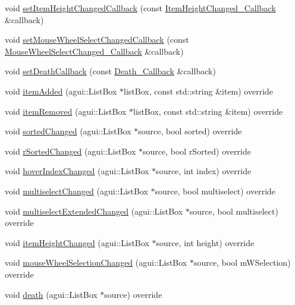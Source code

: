 \begin{DoxyCompactItemize}
\item 
void \mbox{\hyperlink{classec_1_1_generic_list_box_listener_a41a4c91d77d0b3470147489b09c7d140}{set\+Item\+Height\+Changed\+Callback}} (const \mbox{\hyperlink{classec_1_1_generic_list_box_listener_aaba7b764c07b0c7cffd9b880bdf46358}{Item\+Height\+Changed\+\_\+\+Callback}} \&callback)
\item 
void \mbox{\hyperlink{classec_1_1_generic_list_box_listener_af51feb582139508e18215d7ae8430886}{set\+Mouse\+Wheel\+Select\+Changed\+Callback}} (const \mbox{\hyperlink{classec_1_1_generic_list_box_listener_abe17afe409710ad4f15673669a8ebbb3}{Mouse\+Wheel\+Select\+Changed\+\_\+\+Callback}} \&callback)
\item 
void \mbox{\hyperlink{classec_1_1_generic_list_box_listener_add7031a36395dc935dbc0adff256c4e1}{set\+Death\+Callback}} (const \mbox{\hyperlink{classec_1_1_generic_list_box_listener_a121e777735fcbf9e15e147d820e5718e}{Death\+\_\+\+Callback}} \&callback)
\item 
void \mbox{\hyperlink{classec_1_1_generic_list_box_listener_a6003842e8b318a5b28a456158bd5eab1}{item\+Added}} (agui\+::\+List\+Box $\ast$list\+Box, const std\+::string \&item) override
\item 
void \mbox{\hyperlink{classec_1_1_generic_list_box_listener_a9b2412b88135015e4aaa57ad6f8f1a79}{item\+Removed}} (agui\+::\+List\+Box $\ast$list\+Box, const std\+::string \&item) override
\item 
void \mbox{\hyperlink{classec_1_1_generic_list_box_listener_a52b32a361ac45c09f0a3ada6e52334d6}{sorted\+Changed}} (agui\+::\+List\+Box $\ast$source, bool sorted) override
\item 
void \mbox{\hyperlink{classec_1_1_generic_list_box_listener_a50f60a671cd8dcfcce7ab99d7383ad4f}{r\+Sorted\+Changed}} (agui\+::\+List\+Box $\ast$source, bool r\+Sorted) override
\item 
void \mbox{\hyperlink{classec_1_1_generic_list_box_listener_a222a9b88623d11a0a60a6caec4f59259}{hover\+Index\+Changed}} (agui\+::\+List\+Box $\ast$source, int index) override
\item 
void \mbox{\hyperlink{classec_1_1_generic_list_box_listener_a6471d2661d969170f644bc4ebc3cb2f5}{multiselect\+Changed}} (agui\+::\+List\+Box $\ast$source, bool multiselect) override
\item 
void \mbox{\hyperlink{classec_1_1_generic_list_box_listener_ac440be24147c05e37a5be442aaa1d0f8}{multiselect\+Extended\+Changed}} (agui\+::\+List\+Box $\ast$source, bool multiselect) override
\item 
void \mbox{\hyperlink{classec_1_1_generic_list_box_listener_ad4855a32d0d67d3c2581212b51fa1765}{item\+Height\+Changed}} (agui\+::\+List\+Box $\ast$source, int height) override
\item 
void \mbox{\hyperlink{classec_1_1_generic_list_box_listener_aa1e0ea8a38c89f2e073a51b76264fc4a}{mouse\+Wheel\+Selection\+Changed}} (agui\+::\+List\+Box $\ast$source, bool m\+W\+Selection) override
\item 
void \mbox{\hyperlink{classec_1_1_generic_list_box_listener_a9ac0f293d7169cad08bde3285cea1edc}{death}} (agui\+::\+List\+Box $\ast$source) override
\end{DoxyCompactItemize}


